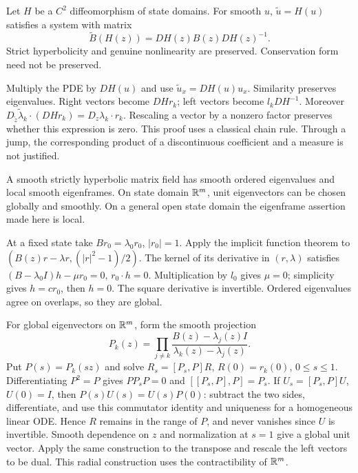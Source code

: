 \begin{theorem}
Let $H$ be a $C^2$ diffeomorphism of state domains. For smooth $u$,
$\widetilde u=H(u)$ satisfies a system with matrix
\[
 \widetilde B(H(z))=DH(z)B(z)DH(z)^{-1}.
\]
Strict hyperbolicity and genuine nonlinearity are preserved.
Conservation form need not be preserved.
\end{theorem}
\begin{expandedproof}
Multiply the PDE by $DH(u)$ and use $\widetilde u_x=DH(u)u_x$.
Similarity preserves eigenvalues. Right vectors become $DH r_k$;
left vectors become $l_k DH^{-1}$. Moreover
$D_{\widetilde z}\widetilde\lambda_k\cdot(DH r_k)
=D_z\lambda_k\cdot r_k$. Rescaling a vector by a nonzero factor
preserves whether this expression is zero. This proof uses a
classical chain rule. Through a jump, the corresponding product of
a discontinuous coefficient and a measure is not justified.
\end{expandedproof}

\begin{theorem}
A smooth strictly hyperbolic matrix field has smooth ordered
 eigenvalues and local smooth eigenframes. On state domain $\mathbb{R}^m$,
unit eigenvectors can be chosen globally and smoothly. On a general
open state domain the eigenframe assertion made here is local.
\end{theorem}
\begin{expandedproof}
At a fixed state take $Br_0=\lambda_0r_0$, $|r_0|=1$.
Apply the implicit function theorem to
$(B(z)r-\lambda r,(|r|^2-1)/2)$. The kernel of its derivative in
$(r,\lambda)$ satisfies
$(B-\lambda_0I)h-\mu r_0=0$, $r_0\cdot h=0$.
Multiplication by $l_0$ gives $\mu=0$; simplicity gives $h=cr_0$,
then $h=0$. The square derivative is invertible. Ordered eigenvalues
agree on overlaps, so they are global.

For global eigenvectors on $\mathbb{R}^m$, form the smooth projection
\[
 P_k(z)=\prod_{j\ne k}
 \frac{B(z)-\lambda_j(z)I}{\lambda_k(z)-\lambda_j(z)}.
\]
Put $P(s)=P_k(sz)$ and solve
$R_s=[P_s,P]R$, $R(0)=r_k(0)$, $0\le s\le1$.
Differentiating $P^2=P$ gives $PP_sP=0$ and
$[[P_s,P],P]=P_s$. If $U_s=[P_s,P]U$, $U(0)=I$, then
$P(s)U(s)=U(s)P(0)$: subtract the two sides, differentiate, and use
this commutator identity and uniqueness for a homogeneous linear ODE.
Hence $R$ remains in the range of $P$, and never vanishes since
$U$ is invertible. Smooth dependence on $z$ and normalization at
$s=1$ give a global unit vector. Apply the same construction to the
transpose and rescale the left vectors to be dual. This radial
construction uses the contractibility of $\mathbb{R}^m$.
\end{expandedproof}
